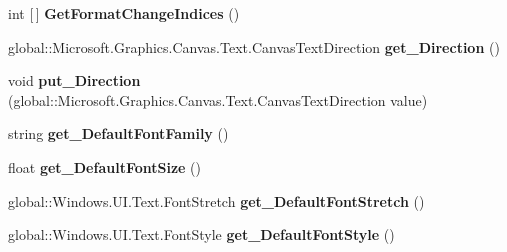 \begin{DoxyCompactItemize}
\item 
\mbox{\label{class_microsoft_1_1_graphics_1_1_canvas_1_1_text_1_1_canvas_text_layout_a3a21e6cfe852ee1c03c9ae0f65349cbe}} 
int \mbox{[}$\,$\mbox{]} {\bfseries Get\+Format\+Change\+Indices} ()
\item 
\mbox{\label{class_microsoft_1_1_graphics_1_1_canvas_1_1_text_1_1_canvas_text_layout_acf787c5c52efb0a761fd5fa779c0b7a6}} 
global\+::\+Microsoft.\+Graphics.\+Canvas.\+Text.\+Canvas\+Text\+Direction {\bfseries get\+\_\+\+Direction} ()
\item 
\mbox{\label{class_microsoft_1_1_graphics_1_1_canvas_1_1_text_1_1_canvas_text_layout_a73aa648a92dd6826fcda1869c17dd35d}} 
void {\bfseries put\+\_\+\+Direction} (global\+::\+Microsoft.\+Graphics.\+Canvas.\+Text.\+Canvas\+Text\+Direction value)
\item 
\mbox{\label{class_microsoft_1_1_graphics_1_1_canvas_1_1_text_1_1_canvas_text_layout_a3b9b032aa706d4c64f518de16b2fb53d}} 
string {\bfseries get\+\_\+\+Default\+Font\+Family} ()
\item 
\mbox{\label{class_microsoft_1_1_graphics_1_1_canvas_1_1_text_1_1_canvas_text_layout_a7b61d023318daba6edb2a2a6e8d53fa4}} 
float {\bfseries get\+\_\+\+Default\+Font\+Size} ()
\item 
\mbox{\label{class_microsoft_1_1_graphics_1_1_canvas_1_1_text_1_1_canvas_text_layout_a39ba6144e9670d96a118f3b5b8933014}} 
global\+::\+Windows.\+U\+I.\+Text.\+Font\+Stretch {\bfseries get\+\_\+\+Default\+Font\+Stretch} ()
\item 
\mbox{\label{class_microsoft_1_1_graphics_1_1_canvas_1_1_text_1_1_canvas_text_layout_a027a22f4db9f7685afafe0bab3bf926b}} 
global\+::\+Windows.\+U\+I.\+Text.\+Font\+Style {\bfseries get\+\_\+\+Default\+Font\+Style} ()

\end{DoxyCompactItemize}
